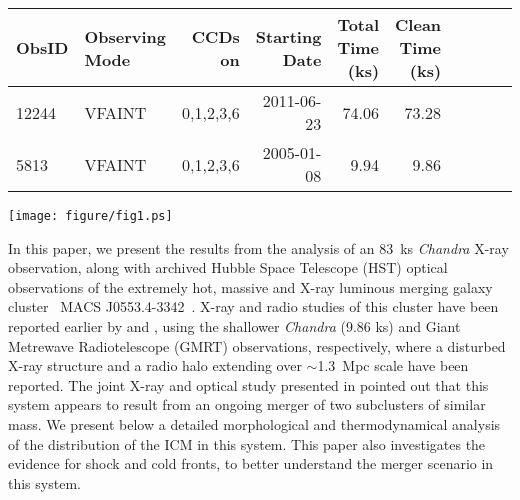 \documentclass[useASM,usenatbib]{mn2e}
\newcommand{\mac}{\rm~MACS J0553.4-3342}
\begin{document}
\begin{table*}
\begin{center}
  \caption{{\it Chandra} Observation log for \mac\ }
  \begin{tabular}{llrrrrlrlr}
    \hline
    \hline
    ObsID &Observing Mode &CCDs on &Starting Date  &Total Time (ks)& Clean Time (ks)\\
    \hline
    \hline
    
    12244 &VFAINT &0,1,2,3,6  & 2011-06-23&74.06 &73.28 \\
    5813  &VFAINT &0,1,2,3,6  & 2005-01-08&9.94 & 9.86\\
    
    \hline
    \hline
    \end{tabular}	
  \label{tab1}
\end{center}
\end{table*}
\begin{figure*}
\texttt{[image: figure/fig1.ps]}
\caption{Background subtracted, exposure-corrected central 5$\arcmin
  \times 5\arcmin$ 
         {\it Chandra} image (0.7-2.0 keV) of \mac. This image
  has been smoothed with a Gaussian kernel of width $\sigma =
  3\arcsec$. Arrows in this figure indicate the presence of an X-ray
  tail-like feature, seen along the north-east direction, appearing to
  originate from the centre of eastern subcluster (SC1). The two
  subclusters identified by \protect\cite{2012MNRAS.420.2120M} are
  highlighted by blue crosses.}
\label{fig1}
\end{figure*}
\par In this paper, we present the results from the analysis of an
83~ks {\it Chandra} X-ray observation, along with archived Hubble
Space Telescope (HST) optical observations of the extremely hot,
massive and X-ray luminous merging galaxy cluster
\mac~\citep[z=0.43,][]{2012MNRAS.420.2120M}. X-ray and radio studies
of this cluster have been reported earlier by
\cite{2012MNRAS.420.2120M} and \cite{2012MNRAS.426...40B}, using the
shallower {\it Chandra} (9.86 ks) and Giant Metrewave Radiotelescope
(GMRT) observations, respectively, where a disturbed X-ray structure
and a radio halo extending over $\sim$1.3~Mpc scale have been
reported. The joint X-ray and optical study presented in
\cite{2012MNRAS.420.2120M} pointed out that this system appears to
result from an ongoing merger of two subclusters of similar mass.
We present below a detailed morphological and thermodynamical analysis
of the distribution of the ICM in this system. This paper
also investigates the  evidence for shock and cold fronts, to
better understand the merger scenario in this system. \\
\end{document}
